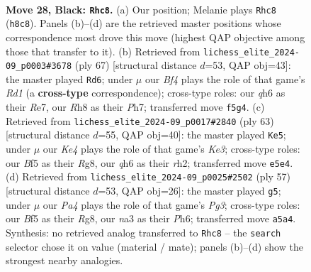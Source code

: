 \documentclass[11pt]{article}
\begin{document}
\clearpage

\begin{figure}[p]\centering
\begin{subfigure}{0.46\textwidth}\centering
\resizebox{\linewidth}{!}{%
\newchessgame
\chessboard[
  setfen={1r5r/7p/1p5Q/p3kb2/7P/N7/PP3PP1/R5K1 b - - 4 28},
  showmover=false,
  pgfstyle=straightmove, color=movearrow, markmove={h8-c8}
]}
\caption{}
\end{subfigure}\hfill
\begin{subfigure}{0.46\textwidth}\centering
\resizebox{\linewidth}{!}{%
\newchessgame
\chessboard[
  setfen={3r2k1/1p2r2p/1b2P3/8/1p6/1N3BP1/1PP4P/1K2R3 b - - 0 34},
  showmover=false,
  pgfstyle=straightmove, color=movearrow, markmove={d8-d6}
]}
\caption{}
\end{subfigure}
\\[4pt]
\begin{subfigure}{0.46\textwidth}\centering
\resizebox{\linewidth}{!}{%
\newchessgame
\chessboard[
  setfen={6rr/R7/2p1kp2/8/8/1NP1pP1p/PPK4R/8 b - - 2 32},
  showmover=false,
  pgfstyle=straightmove, color=movearrow, markmove={e6-e5}
]}
\caption{}
\end{subfigure}\hfill
\begin{subfigure}{0.46\textwidth}\centering
\resizebox{\linewidth}{!}{%
\newchessgame
\chessboard[
  setfen={3r2r1/p3kp2/3p2pp/8/3Q1N2/8/1PP2P1P/1K6 b - - 1 29},
  showmover=false,
  pgfstyle=straightmove, color=movearrow, markmove={g6-g5}
]}
\caption{}
\end{subfigure}
\caption{\textbf{Move 28, Black: \texttt{Rhc8}.} (a) Our position; Melanie plays \texttt{Rhc8} (\texttt{h8c8}). Panels (b)--(d) are the retrieved master positions whose correspondence most drove this move (highest QAP objective among those that transfer to it). (b) Retrieved from \texttt{lichess\_elite\_2024-09\_p0003\#3678} (ply 67) [structural distance $d$=53, QAP obj=43]: the master played \texttt{Rd6}; under $\mu$ our \emph{Bf4} plays the role of that game's \emph{Rd1} (a \textbf{cross-type} correspondence); cross-type roles: our \emph{q}h6 as their \emph{R}e7, our \emph{R}h8 as their \emph{P}h7; transferred move \texttt{f5g4}. (c) Retrieved from \texttt{lichess\_elite\_2024-09\_p0017\#2840} (ply 63) [structural distance $d$=55, QAP obj=40]: the master played \texttt{Ke5}; under $\mu$ our \emph{Ke4} plays the role of that game's \emph{Ke3}; cross-type roles: our \emph{B}f5 as their \emph{R}g8, our \emph{q}h6 as their \emph{r}h2; transferred move \texttt{e5e4}. (d) Retrieved from \texttt{lichess\_elite\_2024-09\_p0025\#2502} (ply 57) [structural distance $d$=53, QAP obj=26]: the master played \texttt{g5}; under $\mu$ our \emph{Pa4} plays the role of that game's \emph{Pg3}; cross-type roles: our \emph{B}f5 as their \emph{R}g8, our \emph{n}a3 as their \emph{P}h6; transferred move \texttt{a5a4}. Synthesis: no retrieved analog transferred to \texttt{Rhc8} -- the \texttt{search} selector chose it on value (material / mate); panels (b)--(d) show the strongest nearby analogies.}
\label{fig:thought-m55}
\end{figure}
\end{document}
